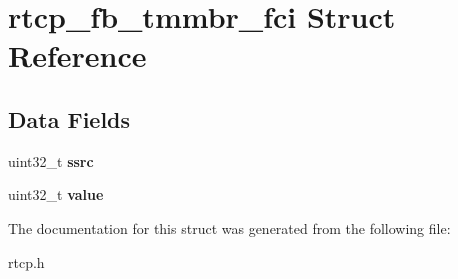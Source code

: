 \section{rtcp\+\_\+fb\+\_\+tmmbr\+\_\+fci Struct Reference}
\label{structrtcp__fb__tmmbr__fci}
\subsection*{Data Fields}
\begin{DoxyCompactItemize}
\item 
\mbox{\label{structrtcp__fb__tmmbr__fci_aabc6d763ae5dc874030736542ca0ff3d}} 
uint32\+\_\+t {\bfseries ssrc}
\item 
\mbox{\label{structrtcp__fb__tmmbr__fci_a007cc9d190ea86a2f077796665048d4f}} 
uint32\+\_\+t {\bfseries value}
\end{DoxyCompactItemize}


The documentation for this struct was generated from the following file\+:\begin{DoxyCompactItemize}
\item 
rtcp.\+h\end{DoxyCompactItemize}
